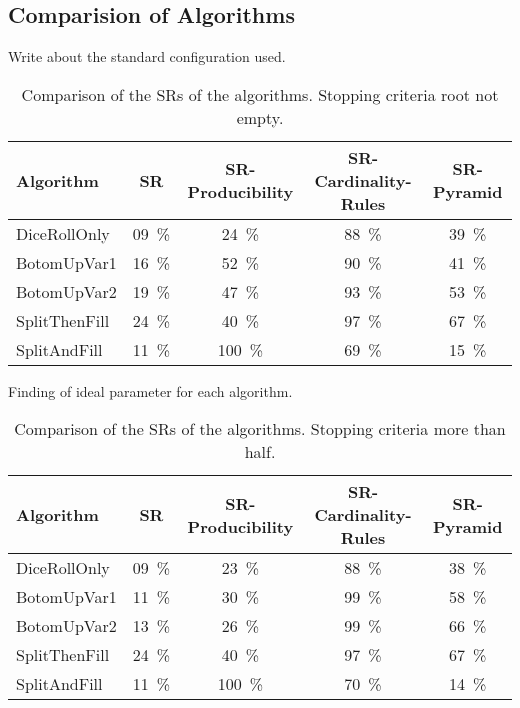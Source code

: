 \pagebreak
\subsection{Comparision of Algorithms} \label{ComparisonOfAlgorithms}
\noindent Write about the standard configuration used.
\begin{table}[H]
	\centering
	\begin{tabular}{ | l | c |c |c |c | }
		\hline
Algorithm 		& SR 	& SR-Producibility 	& SR-Cardinality-Rules 	& SR-Pyramid   	\\ \hline
\hline
DiceRollOnly 	& 09~\%	& 24~\% & 88~\% & 39~\%		\\ \hline
BotomUpVar1 	& 16~\% & 52~\% & 90~\% & 41~\% 	\\ \hline
BotomUpVar2 	& 19~\% & 47~\% & 93~\% & 53~\% 	\\ \hline
SplitThenFill 	& 24~\% & 40~\% & 97~\% & 67~\% 	\\ \hline
SplitAndFill 	& 11~\% & 100~\% & 69~\% & 15~\% 	\\ \hline
	\end{tabular}
	\caption{Comparison of the SRs of the algorithms. Stopping criteria root not empty.}
	\label{comparisonAlgorithms}
\end{table}
Finding of ideal parameter for each algorithm.

\begin{table}[H]
	\centering
	\begin{tabular}{ | l | c |c |c |c | }
		\hline
		Algorithm 		& SR 	& SR-Producibility 	& SR-Cardinality-Rules 	& SR-Pyramid   	\\ \hline
		\hline
		DiceRollOnly 	& 09~\%	& 23~\% & 88~\% & 38~\%		\\ \hline
		BotomUpVar1 	& 11~\% & 30~\% & 99~\% & 58~\% 	\\ \hline
		BotomUpVar2 	& 13~\% & 26~\% & 99~\% & 66~\% 	\\ \hline
		SplitThenFill 	& 24~\% & 40~\% & 97~\% & 67~\% 	\\ \hline
		SplitAndFill 	& 11~\% & 100~\% & 70~\% & 14~\% 	\\ \hline
	\end{tabular}
	\caption{Comparison of the SRs of the algorithms. Stopping criteria more than half.}
	\label{comparisonAlgorithms}
\end{table}



